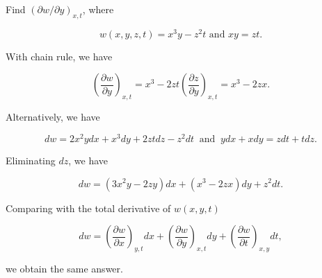 \documentclass[english,a4paper,12pt]{report}
\begin{document}
{Find \( \left( \partial w / \partial y  \right)_{x,t} \), where 

\begin{equation}
	w(x,y,z,t) = x^3 y-z^2t \text { and } xy = zt.
\end{equation}
}
{With chain rule, we have

\begin{equation}
	\left( \frac{\partial w}{\partial y}  \right)_{x,t} = x^3 -2zt \left( \frac{\partial z}{\partial y}  \right)_{x,t} = x^3 - 2zx.  
\end{equation}

Alternatively, we have

\begin{equation}
	dw = 2x^2ydx+x^3 dy+2zt dz-z^2dt ~\text { and }~ ydx+xdy=zdt+tdz.
\end{equation}

Eliminating \(dz\), we have 

\begin{equation}
	dw = (3x^2y-2zy)dx + (x^3 - 2zx)dy+z^2dt. 
\end{equation}

Comparing with the total derivative of \(w(x,y,t)\) 

\begin{equation}
	dw = \left( \frac{\partial w}{\partial x}  \right)_{y,t} dx + \left( \frac{\partial w}{\partial y}  \right)_{x,t} dy +  \left( \frac{\partial w}{\partial t}  \right)_{x,y} dt ,  
\end{equation}

we obtain the same answer.
} 
\end{document}
